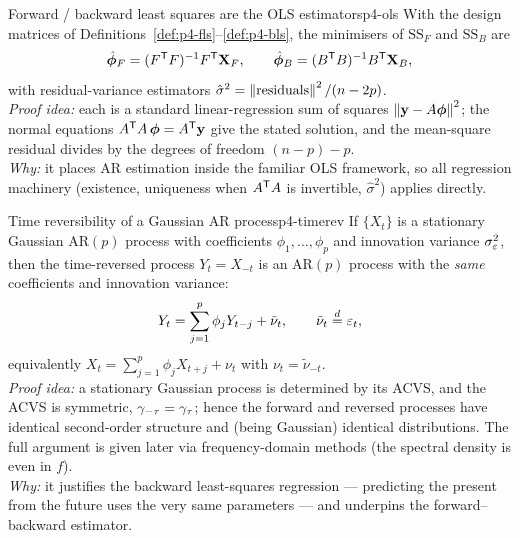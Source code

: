 \begin{proposition}{Forward / backward least squares are the OLS estimators}{p4-ols}
With the design matrices of Definitions~\ref{def:p4-fls}--\ref{def:p4-bls}, the
minimisers of $\mathrm{SS}_F$ and $\mathrm{SS}_B$ are
\[
\hat{\boldsymbol\phi}_F=(F^{\mathsf{T}} F)^{-1}F^{\mathsf{T}}\mathbf X_F,
\qquad
\hat{\boldsymbol\phi}_B=(B^{\mathsf{T}} B)^{-1}B^{\mathsf{T}}\mathbf X_B,
\]
with residual-variance estimators
$\hat\sigma^2=\left\lVert \text{residuals} \right\rVert^2/(n-2p)$.\\[2pt]
\textit{Proof idea:} each is a standard linear-regression sum of squares
$\left\lVert \mathbf y-A\boldsymbol\phi \right\rVert^2$; the normal equations
$A^{\mathsf{T}} A\,\boldsymbol\phi=A^{\mathsf{T}}\mathbf y$ give the stated solution, and the
mean-square residual divides by the degrees of freedom $(n-p)-p$.\\
\textit{Why:} it places AR estimation inside the familiar OLS framework, so all
regression machinery (existence, uniqueness when $A^{\mathsf{T}} A$ is invertible,
$\hat\sigma^2$) applies directly.
\end{proposition}

\begin{proposition}{Time reversibility of a Gaussian AR process}{p4-timerev}
If $\{X_t\}$ is a stationary Gaussian AR$(p)$ process with coefficients
$\phi_1,\dots,\phi_p$ and innovation variance $\sigma_\varepsilon^2$, then the
time-reversed process $Y_t=X_{-t}$ is an AR$(p)$ process with the
\emph{same} coefficients and innovation variance:
\[
Y_t=\sum_{j=1}^p\phi_jY_{t-j}+\tilde\nu_t,\qquad \tilde\nu_t\overset{d}{=}\varepsilon_t,
\]
equivalently $X_t=\sum_{j=1}^p\phi_jX_{t+j}+\nu_t$ with $\nu_t=\tilde\nu_{-t}$.\\[2pt]
\textit{Proof idea:} a stationary Gaussian process is determined by its ACVS,
and the ACVS is symmetric, $\gamma_{-\tau}=\gamma_\tau$; hence the forward and
reversed processes have identical second-order structure and (being Gaussian)
identical distributions. The full argument is given later via frequency-domain
methods (the spectral density is even in $f$).\\
\textit{Why:} it justifies the backward least-squares regression --- predicting
the present from the future uses the very same parameters --- and underpins the
forward--backward estimator.
\end{proposition}

